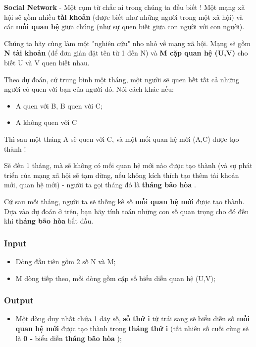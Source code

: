 



\textbf{    Social Network   }   - Một cụm từ chắc ai trong chúng ta đều biết ! Một mạng xã hội sẽ gồm nhiều   \textbf{     tài khoản}   (được biết như những người trong một xã hội) và các   \textbf{     mối quan hệ}   giữa chúng (như sự quen biết giữa con người với con người).  

   Chúng ta hãy cùng làm một "nghiên cứu" nho nhỏ về mạng xã hội. Mạng sẽ gồm   \textbf{     N    tài khoản   }   (để đơn giản đặt tên từ 1 đến N) và   \textbf{     M    cặp quan hệ    \textbf{     (U,V)    }}   cho biết U và V quen biết nhau.  

   Theo dự đoán, cứ trung bình một tháng, một người sẽ quen hết tất cả những người có quen với bạn của người đó. Nói cách khác nếu:  
\begin{itemize}
	\item     A quen với B, B quen với C;   
	\item     A không quen với C   
\end{itemize}

   Thì sau một tháng A sẽ quen với C, và một mối quan hệ mới (A,C) được tạo thành !  

   Sẽ đến 1 tháng, mà sẽ không có mối quan hệ mới nào được tạo thành (và sự phát triển của mạng xã hội sẽ tạm dừng, nếu không kích thích tạo thêm tài khoản mới, quan hệ mới) - người ta gọi tháng đó là   \textbf{     tháng bão hòa}   .  

   Cứ sau mỗi tháng, người ta sẽ thống kê số   \textbf{     mối quan hệ mới}   được tạo thành. Dựa vào dự đoán ở trên, bạn hãy tính toán những con số quan trọng cho đó đến khi   \textbf{     tháng bão hòa}   bắt đầu.  

\subsubsection{   Input  }
\begin{itemize}
	\item     Dòng đầu tiên gồm 2 số N và M;   
	\item     M dòng tiếp theo, mỗi dòng gồm cặp số biểu diễn quan hệ (U,V);   
\end{itemize}

\subsubsection{   Output  }
\begin{itemize}
	\item     Một dòng duy nhất chứa 1 dãy số,    \textbf{      số thứ i}    từ trái sang sẽ biểu diễn số    \textbf{      mối quan hệ mới}    được tạo thành trong    \textbf{      tháng thứ i}    (tất nhiên số cuối cùng sẽ là    \textbf{      0 -}    biểu diễn    \textbf{      tháng bão hòa}    );   
\end{itemize}

